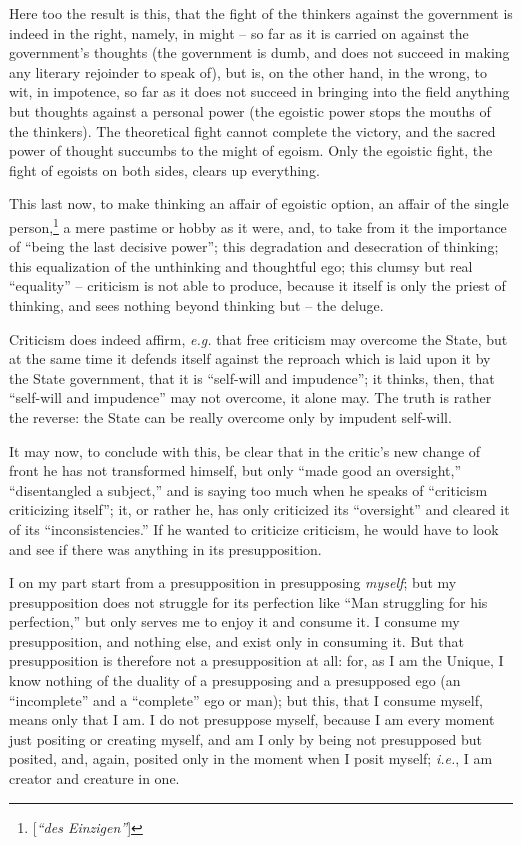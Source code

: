 \documentclass[12pt,a4paper]{book}
\begin{document}
Here too the result is this, that the fight of the thinkers against the 
government is indeed in the right, namely, in might -- so far as it is carried 
on against the government's thoughts (the government is dumb, and does not 
succeed in making any literary rejoinder to speak of), but is, on the other 
hand, in the wrong, to wit, in impotence, so far as it does not succeed in 
bringing into the field anything but thoughts against a personal power (the 
egoistic power stops the mouths of the thinkers). The theoretical fight cannot 
complete the victory, and the sacred power of thought succumbs to the might of 
egoism. Only the egoistic fight, the fight of egoists on both sides, clears up 
everything.

This last now, to make thinking an affair of egoistic option, an affair of the 
single person,\footnote{[\textit{``des Einzigen''}]} a mere pastime or hobby 
as it were, and, to take from it the importance of ``being the last decisive 
power''; this degradation and desecration of thinking; this equalization of 
the unthinking and thoughtful ego; this clumsy but real ``equality'' -- 
criticism is not able to produce, because it itself is only the priest of 
thinking, and sees nothing beyond thinking but -- the deluge.

Criticism does indeed affirm, \textit{e.g.} that free criticism may overcome 
the State, but at the same time it defends itself against the reproach which 
is laid upon it by the State government, that it is ``self-will and 
impudence''; it thinks, then, that ``self-will and impudence'' may not 
overcome, it alone may. The truth is rather the reverse: the State can be 
really overcome only by impudent self-will.

It may now, to conclude with this, be clear that in the critic's new change of 
front he has not transformed himself, but only ``made good an oversight,'' 
``disentangled a subject,'' and is saying too much when he speaks of 
``criticism criticizing itself''; it, or rather he, has only criticized its 
``oversight'' and cleared it of its ``inconsistencies.'' If he wanted to 
criticize criticism, he would have to look and see if there was anything in 
its presupposition.

I on my part start from a presupposition in presupposing \textit{myself}; but 
my presupposition does not struggle for its perfection like ``Man struggling 
for his perfection,'' but only serves me to enjoy it and consume it. I 
consume my presupposition, and nothing else, and exist only in consuming it. 
But that presupposition is therefore not a presupposition at all: for, as I am 
the Unique, I know nothing of the duality of a presupposing and a presupposed 
ego (an ``incomplete'' and a ``complete'' ego or man); but this, that I 
consume myself, means only that I am. I do not presuppose myself, because I am 
every moment just positing or creating myself, and am I only by being not 
presupposed but posited, and, again, posited only in the moment when I posit 
myself; \textit{i.e.}, I am creator and creature in one.
\end{document}
